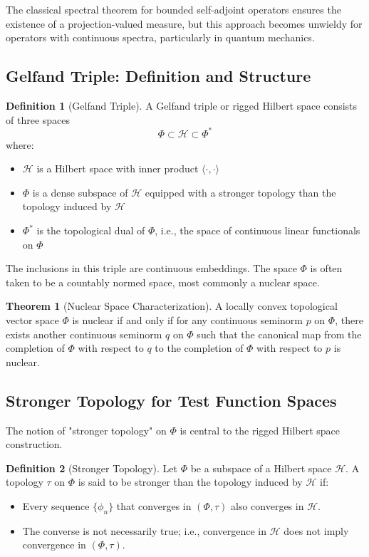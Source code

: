 \documentclass[12pt,a4paper]{article}
\theoremstyle{definition}
\newtheorem{definition}{Definition}
\newtheorem{theorem}{Theorem}
\begin{document}
The classical spectral theorem for bounded self-adjoint operators ensures the existence of a projection-valued measure, but this approach becomes unwieldy for operators with continuous spectra, particularly in quantum mechanics.

\subsection{Gelfand Triple: Definition and Structure}

\begin{definition}[Gelfand Triple]
A Gelfand triple or rigged Hilbert space consists of three spaces
\begin{equation}
    \Phi \subset \mathcal{H} \subset \Phi^*
\end{equation}
where:
\begin{itemize}
    \item $\mathcal{H}$ is a Hilbert space with inner product $\langle \cdot, \cdot \rangle$
    \item $\Phi$ is a dense subspace of $\mathcal{H}$ equipped with a stronger topology than the topology induced by $\mathcal{H}$
    \item $\Phi^*$ is the topological dual of $\Phi$, i.e., the space of continuous linear functionals on $\Phi$
\end{itemize}
\end{definition}

The inclusions in this triple are continuous embeddings. The space $\Phi$ is often taken to be a countably normed space, most commonly a nuclear space.

\begin{theorem}[Nuclear Space Characterization]
A locally convex topological vector space $\Phi$ is nuclear if and only if for any continuous seminorm $p$ on $\Phi$, there exists another continuous seminorm $q$ on $\Phi$ such that the canonical map from the completion of $\Phi$ with respect to $q$ to the completion of $\Phi$ with respect to $p$ is nuclear.
\end{theorem}

\subsection{Stronger Topology for Test Function Spaces}

The notion of "stronger topology" on $\Phi$ is central to the rigged Hilbert space construction.

\begin{definition}[Stronger Topology]
Let $\Phi$ be a subspace of a Hilbert space $\mathcal{H}$. A topology $\tau$ on $\Phi$ is said to be stronger than the topology induced by $\mathcal{H}$ if:
\begin{itemize}
    \item Every sequence $\{\phi_n\}$ that converges in $(\Phi, \tau)$ also converges in $\mathcal{H}$.
    \item The converse is not necessarily true; i.e., convergence in $\mathcal{H}$ does not imply convergence in $(\Phi, \tau)$.
\end{itemize}
\end{definition}
\end{document}
